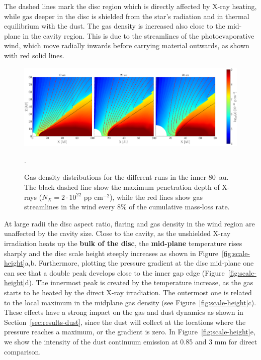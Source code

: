 \documentclass[fleqn,usenatbib]{mnras}
\begin{document}
        The dashed lines mark the disc region which is directly affected by X-ray heating, while gas deeper in the disc is shielded from the star's radiation and in thermal equilibrium with the dust.
        The gas density is increased also close to the mid-plane in the cavity region. 
        This is due to the streamlines of the photoevaporative wind, which move radially inwards before carrying material outwards, as shown with red solid lines.
        \begin{figure}
            \centering
            \includegraphics[width=\textwidth]{Fig1}
            \caption{Gas density distributions for the different runs in the inner \SI{80}{au}. The black dashed line show the maximum penetration depth of X-rays ($N_X = 2\cdot 10^{22}$ pp cm$^{-2}$), while the red lines show gas streamlines in the wind every $8\%$ of the cumulative mass-loss rate.}.
            \label{fig:GasDist}
        \end{figure}
        At large radii the disc aspect ratio, flaring and gas density in the wind region are unaffected by the cavity size.
        Close to the cavity, as the unshielded X-ray irradiation heats up the \textbf{bulk of the disc}, the \textbf{mid-plane} temperature rises sharply and the disc scale height steeply increases as shown in Figure~\ref{fig:scale-height}a,b. Furthermore, plotting the pressure gradient at the disc mid-plane one can see that a double peak develops close to the inner gap edge (Figure~\ref{fig:scale-height}d).
        The innermost peak is created by the temperature increase, as the gas starts to be heated by the direct X-ray irradiation. The outermost one is related to the local maximum in the midplane gas density (see Figure~\ref{fig:scale-height}c).
        These effects have a strong impact on the gas and dust dynamics as shown in Section~\ref{sec:results-dust}, since the dust will collect at the locations where the pressure reaches a maximum, or the gradient is zero. In Figure~\ref{fig:scale-height}e, we show the intensity of the dust continuum emission at 0.85 and 3 mm for direct comparison.
        
\end{document}
